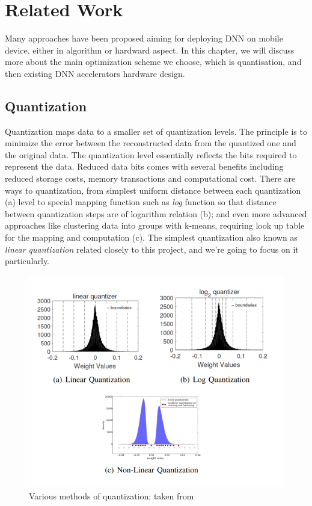 \chapter{Related Work}
\label{ch:related_work}
Many approaches have been proposed aiming for deploying DNN on mobile device, either in algorithm or hardward aspect. In this chapter, we will discuss more about the main optimization scheme we choose, which is quantisation, and then existing DNN accelerators hardware design.
\section{Quantization}
Quantization maps data to a smaller set of quantization levels. The principle is to minimize the error between the reconstructed data from the quantized one and the original data. The quantization level essentially reflects the bits required to represent the data. Reduced data bits comes with several benefits including reduced storage costs, memory transactions and computational cost. There are ways to quantization, from simplest uniform distance between each quantization (a) level to special mapping function such as \textit{log} function so that distance between quantization steps are of logarithm relation (b); and even more advanced approaches like clustering data into groups with k-means, requiring look up table for the mapping and computation (c). The simplest quantization also known as \textit{linear quantization} related closely to this project, and we're going to focus on it particularly.
\begin{figure}
    \centering
    \includegraphics[width=0.8\linewidth]{inc/2_related_work/figure/quantization_types.png}
    \caption{Various methods of quantization; taken from \cite{lognet}\cite{DeepCompression}}
    \label{fig:quant_types}
\end{figure}
